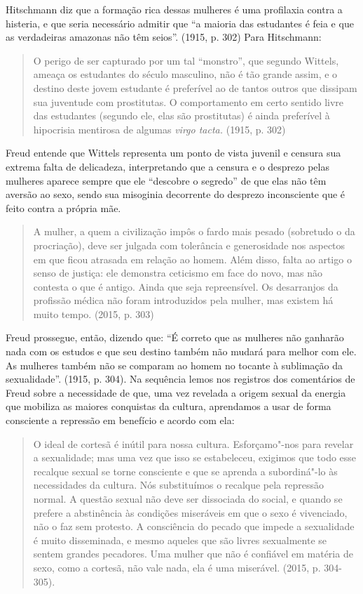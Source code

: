 Hitschmann diz que a formação rica dessas mulheres é uma profilaxia
contra a histeria, e que seria necessário admitir que ``a maioria das
estudantes é feia e que as verdadeiras amazonas não têm seios''. (1915,
p. 302) Para Hitschmann:

\begin{quote}
O perigo de ser capturado por um tal ``monstro'', que segundo Wittels,
ameaça os estudantes do século masculino, não é tão grande assim, e o
destino deste jovem estudante é preferível ao de tantos outros que
dissipam sua juventude com prostitutas. O comportamento em certo sentido
livre das estudantes (segundo ele, elas são prostitutas) é ainda
preferível à hipocrisia mentirosa de algumas \emph{virgo tacta.} (1915,
p. 302)
\end{quote}

Freud entende que Wittels representa um ponto de vista juvenil e censura
sua extrema falta de delicadeza, interpretando que a censura e o
desprezo pelas mulheres aparece sempre que ele ``descobre o segredo'' de
que elas não têm aversão ao sexo, sendo sua misoginia decorrente do
desprezo inconsciente que é feito contra a própria mãe.

\begin{quote}
A mulher, a quem a civilização impôs o fardo mais pesado (sobretudo o da
procriação), deve ser julgada com tolerância e generosidade nos aspectos
em que ficou atrasada em relação ao homem. Além disso, falta ao artigo o
senso de justiça: ele demonstra ceticismo em face do novo, mas não
contesta o que é antigo. Ainda que seja repreensível. Os desarranjos da
profissão médica não foram introduzidos pela mulher, mas existem há
muito tempo. (2015, p. 303)
\end{quote}

Freud prossegue, então, dizendo que: ``É correto que as mulheres não
ganharão nada com os estudos e que seu destino também não mudará para
melhor com ele. As mulheres também não se comparam ao homem no tocante à
sublimação da sexualidade''. (1915, p. 304). Na sequência lemos nos
registros dos comentários de Freud sobre a necessidade de que, uma vez
revelada a origem sexual da energia que mobiliza as maiores conquistas
da cultura, aprendamos a usar de forma consciente a repressão em
benefício e acordo com ela:

\begin{quote}
O ideal de cortesã é inútil para nossa cultura. Esforçamo"-nos para
revelar a sexualidade; mas uma vez que isso se estabeleceu, exigimos que
todo esse recalque sexual se torne consciente e que se aprenda a
subordiná"-lo às necessidades da cultura. Nós substituímos o recalque
pela repressão normal. A questão sexual não deve ser dissociada do
social, e quando se prefere a abstinência às condições miseráveis em que
o sexo é vivenciado, não o faz sem protesto. A consciência do pecado que
impede a sexualidade é muito disseminada, e mesmo aqueles que são livres
sexualmente se sentem grandes pecadores. Uma mulher que não é confiável
em matéria de sexo, como a cortesã, não vale nada, ela é uma miserável.
(2015, p. 304-305).
\end{quote}


